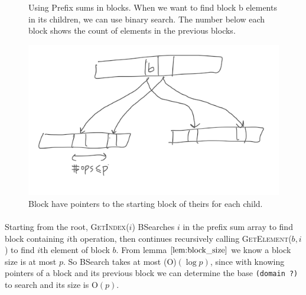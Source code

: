 \documentclass[10pt]{article}
\theoremstyle{definition}
\begin{document}
\begin{figure}
\begin{center}
\end{center}
\caption{\label{fig:prefix} Using Prefix sums in blocks. When we want to find block b elements in its children, we can use binary search. The number below each block shows the count of elements in the previous blocks.}
\end{figure}

\begin{figure}[hbt]
\centering
  \includegraphics[width=5in]{pics/pointers}
  \caption{Block have pointers to the starting block of theirs for each child. \label{fig::pointer}}
\end{figure}


\paragraph{}
Starting from the root, \textsc{GetIndex}($i$) BSearches $i$ in the prefix sum array to find block containing $i$th operation, then continues recursively calling \textsc{GetElement}($b,i$) to find $i$th element of block $b$. From lemma $\ref{lem:block_size}$ we know a block size is at most $p$. So BSearch takes at most \textsc(O)$(\log p)$, since  with knowing pointers of a block and its previous block we can determine the base \texttt{(domain ?)} to search and its size is \textsc{O}$(p)$.
\end{document}
